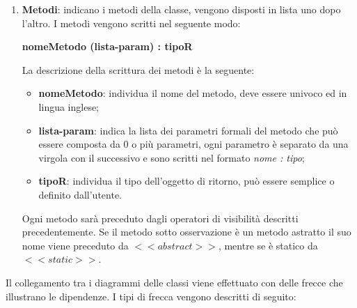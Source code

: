 \begin{enumerate}
\begin{itemize}
	\end{itemize}
	\item \textbf{Metodi}: indicano i metodi della classe, vengono disposti in lista uno dopo l'altro. I metodi vengono scritti nel seguente modo:
	\begin{center}
		\textbf{nomeMetodo (lista-param) : tipoR}
	\end{center}
	La descrizione della scrittura dei metodi è la seguente:
	\begin{itemize}
		\item \textbf{nomeMetodo}: individua il nome del metodo, deve essere univoco ed in lingua inglese;
		\item \textbf{lista-param}: indica la lista dei parametri formali del metodo che può essere composta da 0 o più parametri, ogni parametro è separato da una virgola con il successivo e sono scritti nel formato \textit{nome : tipo};
		\item \textbf{tipoR}: individua il tipo dell'oggetto di ritorno, può essere semplice o definito dall'utente.
	\end{itemize}
	Ogni metodo sarà preceduto dagli operatori di visibilità descritti precedentemente. Se il metodo sotto osservazione è un metodo astratto il suo nome viene preceduto da $<<abstract>>$, mentre se è statico da $<<static>>$.
\end{enumerate}
Il collegamento tra i diagrammi delle classi viene effettuato con delle frecce che illustrano le dipendenze.
I tipi di frecca vengono descritti di seguito:
